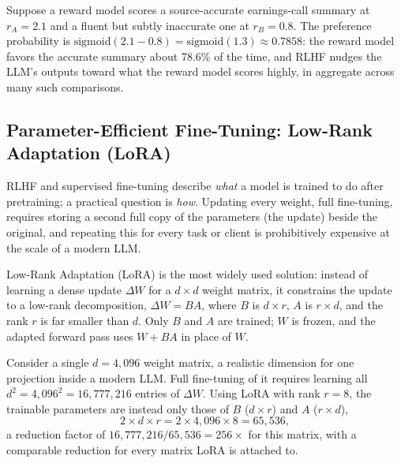 \documentclass[../ai_in_finance]{subfiles}
\begin{document}
Suppose a reward model scores a source-accurate earnings-call summary at $r_A = 2.1$ and a fluent but subtly inaccurate one at $r_B = 0.8$. The preference probability is $\text{sigmoid}(2.1 - 0.8) = \text{sigmoid}(1.3) \approx 0.7858$: the reward model favors the accurate summary about 78.6\% of the time, and RLHF nudges the LLM's outputs toward what the reward model scores highly, in aggregate across many such comparisons.

\subsection{Parameter-Efficient Fine-Tuning: Low-Rank Adaptation (LoRA)}
\label{sec:lora}

RLHF and supervised fine-tuning describe \emph{what} a model is trained to do after pretraining; a practical question is \emph{how}. Updating every weight, full fine-tuning, requires storing a second full copy of the parameters (the update) beside the original, and repeating this for every task or client is prohibitively expensive at the scale of a modern LLM.

Low-Rank Adaptation (LoRA) is the most widely used solution: instead of learning a dense update $\Delta W$ for a $d\times d$ weight matrix, it constrains the update to a low-rank decomposition, $\Delta W = BA$, where $B$ is $d\times r$, $A$ is $r\times d$, and the rank $r$ is far smaller than $d$. Only $B$ and $A$ are trained; $W$ is frozen, and the adapted forward pass uses $W + BA$ in place of $W$.

Consider a single $d=4{,}096$ weight matrix, a realistic dimension for one projection inside a modern LLM. Full fine-tuning of it requires learning all $d^2 = 4{,}096^2 = 16{,}777{,}216$ entries of $\Delta W$. Using LoRA with rank $r=8$, the trainable parameters are instead only those of $B$ ($d \times r$) and $A$ ($r \times d$),
\begin{equation*}
2 \times d \times r = 2 \times 4{,}096 \times 8 = 65{,}536,
\end{equation*}
a reduction factor of $16{,}777{,}216 / 65{,}536 = 256\times$ for this matrix, with a comparable reduction for every matrix LoRA is attached to.
\end{document}
